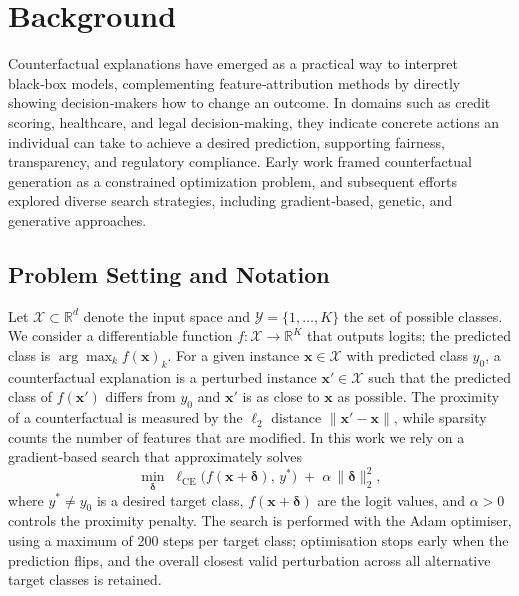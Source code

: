 \documentclass[11pt,a4paper]{article}
\begin{document}
\section{Background}
\label{sec:background}
Counterfactual explanations have emerged as a practical way to interpret black‑box models, complementing feature‑attribution methods by directly showing decision‑makers how to change an outcome. In domains such as credit scoring, healthcare, and legal decision‑making, they indicate concrete actions an individual can take to achieve a desired prediction, supporting fairness, transparency, and regulatory compliance. Early work framed counterfactual generation as a constrained optimization problem, and subsequent efforts explored diverse search strategies, including gradient‑based, genetic, and generative approaches.

\subsection{Problem Setting and Notation}
Let $\mathcal{X}\subset\mathbb{R}^d$ denote the input space and $\mathcal{Y}=\{1,\dots,K\}$ the set of possible classes. We consider a differentiable function $f\colon\mathcal{X}\to\mathbb{R}^K$ that outputs logits; the predicted class is $\arg\max_k f(\mathbf{x})_k$. For a given instance $\mathbf{x}\in\mathcal{X}$ with predicted class $y_0$, a counterfactual explanation is a perturbed instance $\mathbf{x}'\in\mathcal{X}$ such that the predicted class of $f(\mathbf{x}')$ differs from $y_0$ and $\mathbf{x}'$ is as close to $\mathbf{x}$ as possible. The proximity of a counterfactual is measured by the $\ell_2$ distance $\|\mathbf{x}'-\mathbf{x}\|$, while sparsity counts the number of features that are modified. In this work we rely on a gradient‑based search that approximately solves
\begin{equation}
\min_{\boldsymbol{\delta}} \; \ell_{\mathrm{CE}}\bigl(f(\mathbf{x}+\boldsymbol{\delta}),\,y^*\bigr) \;+\; \alpha\,\|\boldsymbol{\delta}\|_2^2,
\label{eq:cf-opt}
\end{equation}
where $y^*\neq y_0$ is a desired target class, $f(\mathbf{x}+\boldsymbol{\delta})$ are the logit values, and $\alpha>0$ controls the proximity penalty. The search is performed with the Adam optimiser, using a maximum of 200 steps per target class; optimisation stops early when the prediction flips, and the overall closest valid perturbation across all alternative target classes is retained.
\end{document}
